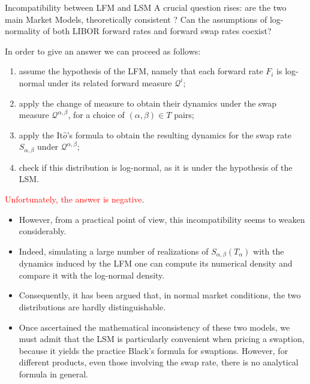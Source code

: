 \documentclass{beamer}
\begin{document}
\begin{frame}{Incompatibility between LFM and LSM}
  A crucial question rises: are the two main Market Models, theoretically consistent ? 
  Can the assumptions of log-normality of both LIBOR forward rates and forward swap rates coexist? 
  
  In order to give an answer we can proceed as follows:
  \begin{enumerate}
  \item assume the hypothesis of the LFM, namely that each forward rate $F_i$ is log-normal under its related forward measure $\mathcal{Q}^i$;
  \item apply the change of measure to obtain their dynamics under the swap measure $\mathcal{Q}^{\alpha,\beta}$, for a choice of $(\alpha,\beta) \in T$ pairs;
  \item apply the It$\hat{o}$’s formula to obtain the resulting dynamics for the swap rate $S_{\alpha,\beta}$ under $\mathcal{Q}^{\alpha,\beta}$;
  \item check if this distribution is log-normal, as it is under the hypothesis of the LSM.
  \end{enumerate}
  \textcolor{red}{Unfortunately, the answer is negative}. 
\end{frame}

\begin{frame}
  \begin{itemize}
  \item However, from a practical point of view, this incompatibility seems to weaken considerably. 
  \item Indeed, simulating a large number of realizations of $S_{\alpha,\beta}(T_\alpha)$ with the dynamics induced by the LFM one can compute its numerical density and compare it with the log-normal density. 
  \item Consequently, it has been argued that, in normal market conditions, the two distributions are hardly distinguishable.
  \item Once ascertained the mathematical inconsistency of these two models, we must admit that the LSM is particularly convenient when pricing a swaption, because it yields the practice Black’s formula for swaptions. However, for different products, even those involving the swap rate, there is no analytical formula in general. 
  \end{itemize}
\end{frame}
\end{document}
